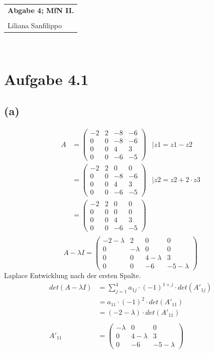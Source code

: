 \documentclass{article} %
\newcommand{\titulo}{Abgabe 4; MfN II.}
\newcommand{\nombre}{Liliana Sanfilippo}
\begin{document}
\begin{tabular}{p{12cm}}
{{\Large\bf\titulo}}\\ 
\vspace{0.2cm}\\
 {\large\nombre}\\
\end{tabular}
\vspace{0.2cm}\\
\section*{Aufgabe 4.1}
\subsection*{(a)}
\begin{align*}
      A & = \begin{pmatrix}
    -2 & 2 & -8 & -6 \\ 
    0 & 0 & -8 & -6 \\
    0 & 0 & 4 & 3 \\ 
    0 & 0 & -6 & -5
    \end{pmatrix} & \mid z1=z1-z2\\ 
    & =  \begin{pmatrix}
    -2 & 2 & 0 & 0 \\ 
    0 & 0 & -8 & -6 \\
    0 & 0 & 4 & 3 \\ 
    0 & 0 & -6 & -5
    \end{pmatrix} & \mid z2=z2 + 2\cdot z3\\ 
     & =  \begin{pmatrix}
    -2 & 2 & 0 & 0 \\ 
    0 & 0 & 0 & 0 \\
    0 & 0 & 4 & 3 \\ 
    0 & 0 & -6 & -5
    \end{pmatrix}\\ 
\end{align*}
\[
      A - \lambda I  = \begin{pmatrix}
    -2 - \lambda & 2 & 0 & 0\\ 
    0 &- \lambda & 0 & 0\\
    0 & 0 & 4 - \lambda  & 3 \\
    0 & 0 & -6 & -5 - \lambda
    \end{pmatrix}
\]
Laplace Entwicklung nach der ersten Spalte. 
\begin{align*}
 det( A - \lambda I) & = \sum^4_{j=1} a_{1j} \cdot (-1)^{1+j} \cdot det(A'_{1j}) \\
    & = a_{11} \cdot (-1)^{2} \cdot det(A'_{11})\\
    & =(-2-\lambda) \cdot det(A'_{11}) \\ \\
    A'_{11} & =  \begin{pmatrix}
    - \lambda & 0 & 0 \\
     0 & 4 - \lambda  & 3 \\ 
     0 & -6 & -5 - \lambda 
    \end{pmatrix} \\ \\
\end{align*}
\end{document}
